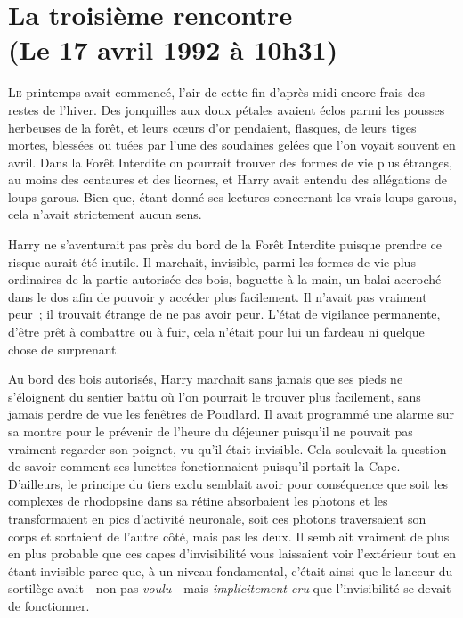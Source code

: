 
\section{La troisième rencontre\\
(Le 17 avril 1992 à 10h31)}

\lettrine{L}{e} printemps avait commencé, l'air de cette fin d'après-midi encore frais des restes de l'hiver. Des jonquilles aux doux pétales avaient éclos parmi les pousses herbeuses de la forêt, et leurs cœurs d'or pendaient, flasques, de leurs tiges mortes, blessées ou tuées par l'une des soudaines gelées que l'on voyait souvent en avril. Dans la Forêt Interdite on pourrait trouver des formes de vie plus étranges, au moins des centaures et des licornes, et Harry avait entendu des allégations de loups-garous. Bien que, étant donné ses lectures concernant les vrais loups-garous, cela n'avait strictement aucun sens.

Harry ne s'aventurait pas près du bord de la Forêt Interdite puisque prendre ce risque aurait été inutile. Il marchait, invisible, parmi les formes de vie plus ordinaires de la partie autorisée des bois, baguette à la main, un balai accroché dans le dos afin de pouvoir y accéder plus facilement. Il n'avait pas vraiment peur~; il trouvait étrange de ne pas avoir peur. L'état de vigilance permanente, d'être prêt à combattre ou à fuir, cela n'était pour lui un fardeau ni quelque chose de surprenant.

Au bord des bois autorisés, Harry marchait sans jamais que ses pieds ne s'éloignent du sentier battu où l'on pourrait le trouver plus facilement, sans jamais perdre de vue les fenêtres de Poudlard. Il avait programmé une alarme sur sa montre pour le prévenir de l'heure du déjeuner puisqu'il ne pouvait pas vraiment regarder son poignet, vu qu'il était invisible. Cela soulevait la question de savoir comment ses lunettes fonctionnaient puisqu'il portait la Cape. D'ailleurs, le principe du tiers exclu semblait avoir pour conséquence que soit les complexes de rhodopsine dans sa rétine absorbaient les photons et les transformaient en pics d'activité neuronale, soit ces photons traversaient son corps et sortaient de l'autre côté, mais pas les deux. Il semblait vraiment de plus en plus probable que ces capes d'invisibilité vous laissaient voir l'extérieur tout en étant invisible parce que, à un niveau fondamental, c'était ainsi que le lanceur du sortilège avait - non pas \emph{voulu} - mais \emph{implicitement cru} que l'invisibilité se devait de fonctionner.

